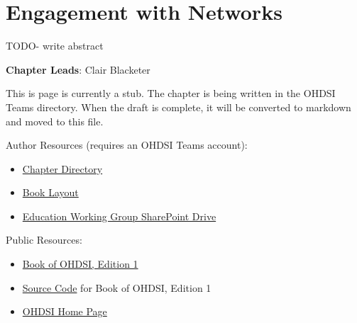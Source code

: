 \documentclass[
  letterpaper,
  paper=7in:10in,
  pagesize=pdftex,
  headinclude=on,
  footinclude=on,
  12pt]{scrbook}
\providecommand{\tightlist}{%
  \setlength{\itemsep}{0pt}\setlength{\parskip}{0pt}}\usepackage{longtable,booktabs,array}
\begin{document}
\chapter{Engagement with Networks}\label{sec-research-engagement}

TODO- write abstract

\hfill\break

\textbf{Chapter Leads}: Clair Blacketer

\begin{tcolorbox}[enhanced jigsaw, opacitybacktitle=0.6, coltitle=black, colback=white, bottomrule=.15mm, bottomtitle=1mm, title=\textcolor{quarto-callout-note-color}{\faInfo}\hspace{0.5em}{Note}, titlerule=0mm, rightrule=.15mm, colbacktitle=quarto-callout-note-color!10!white, colframe=quarto-callout-note-color-frame, toptitle=1mm, arc=.35mm, left=2mm, breakable, opacityback=0, leftrule=.75mm, toprule=.15mm]

This is page is currently a stub. The chapter is being written in the
OHDSI Teams directory. When the draft is complete, it will be converted
to markdown and moved to this file.

Author Resources (requires an OHDSI Teams account):

\begin{itemize}
\tightlist
\item
  \href{https://ohdsiorg.sharepoint.com/sites/Workgroup-EducationWorkingGroup/Shared\%20Documents/Forms/AllItems.aspx?id=\%2Fsites\%2FWorkgroup\%2DEducationWorkingGroup\%2FShared\%20Documents\%2FSection\%20V\%20\%2D\%20Studies\%2FChapter\%2022\%20Networks&viewid=05fec2cc\%2Dec8a\%2D4d04\%2Db565\%2Dcf1289b96f67}{Chapter
  Directory}
\item
  \href{https://ohdsiorg.sharepoint.com/:x:/r/sites/Workgroup-EducationWorkingGroup/_layouts/15/Doc2.aspx?action=edit&sourcedoc=\%7B1fa31e39-1c5f-4918-b878-609ebd9810b3\%7D&wdOrigin=TEAMS-WEB.teamsSdk_ns.rwc&wdExp=TEAMS-TREATMENT&wdhostclicktime=1748104477731&web=1}{Book
  Layout}
\item
  \href{https://ohdsiorg.sharepoint.com/sites/Workgroup-EducationWorkingGroup/Shared\%20Documents/Forms/AllItems.aspx?viewid=05fec2cc\%2Dec8a\%2D4d04\%2Db565\%2Dcf1289b96f67}{Education
  Working Group SharePoint Drive}
\end{itemize}

Public Resources:

\begin{itemize}
\tightlist
\item
  \href{https://ohdsi.github.io/TheBookOfOhdsi/}{Book of OHDSI, Edition
  1}
\item
  \href{https://github.com/OHDSI/TheBookOfOhdsi}{Source Code} for Book
  of OHDSI, Edition 1
\item
  \href{https://ohdsi.org/}{OHDSI Home Page}
\end{itemize}

\end{tcolorbox}
\end{document}
